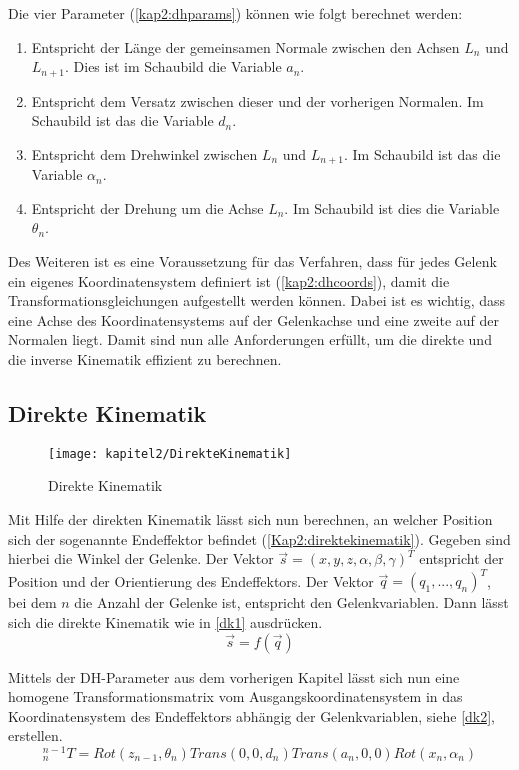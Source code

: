 Die vier Parameter (\autoref{kap2:dhparams}) können wie folgt berechnet werden:
\begin{enumerate}
  \item Entspricht der Länge der gemeinsamen Normale zwischen den Achsen $L_n$ und $L_{n+1}$. Dies ist im Schaubild die Variable $a_n$.
  \item Entspricht dem Versatz zwischen dieser und der vorherigen Normalen. Im Schaubild ist das die Variable $d_n$.
  \item Entspricht dem Drehwinkel zwischen $L_n$ und $L_{n+1}$. Im Schaubild ist das die Variable $\alpha_n$.
  \item Entspricht der Drehung um die Achse $L_n$. Im Schaubild ist dies die Variable $\theta_n$.
\end{enumerate} 

Des Weiteren ist es eine Voraussetzung für das Verfahren, dass für jedes Gelenk ein eigenes Koordinatensystem definiert ist (\autoref{kap2:dhcoords}), damit die Transformationsgleichungen aufgestellt werden können. Dabei ist es wichtig, dass eine Achse des Koordinatensystems auf der Gelenkachse und eine zweite auf der Normalen liegt. Damit sind nun alle Anforderungen erfüllt, um die direkte und die inverse Kinematik effizient zu berechnen.

\subsection{Direkte Kinematik}

\begin{figure}[b!]
  \centering
  \texttt{[image: kapitel2/DirekteKinematik]}
  \caption{Direkte Kinematik}
  \label{Kap2:direktekinematik}
\end{figure}

Mit Hilfe der direkten Kinematik lässt sich nun berechnen, an welcher Position sich der sogenannte Endeffektor befindet (\autoref{Kap2:direktekinematik}). Gegeben sind hierbei die Winkel der Gelenke. Der Vektor $ \vec{s} = (x,y,z,\alpha,\beta,\gamma)^T $  entspricht der Position und der Orientierung des Endeffektors. Der Vektor $ \vec{q} = (q_1, ...,q_n)^T $, bei dem $n$ die Anzahl der Gelenke ist, entspricht den Gelenkvariablen. Dann lässt sich die direkte Kinematik wie in \autoref{dk1} ausdrücken.
\begin{equation}
  \vec{s} = f(\vec{q})
\label{dk1}
\end{equation}

Mittels der DH-Parameter aus dem vorherigen Kapitel lässt sich nun eine homogene Transformationsmatrix vom Ausgangskoordinatensystem in das Koordinatensystem des Endeffektors abhängig der Gelenkvariablen, siehe \autoref{dk2}, erstellen.
\begin{equation}
  ^{n-1}_{n}T = Rot(z_{n-1},\theta_n)Trans(0,0,d_{n})Trans(a_{n},0,0)Rot(x_{n},\alpha_{n})
\label{dk2}
\end{equation}

